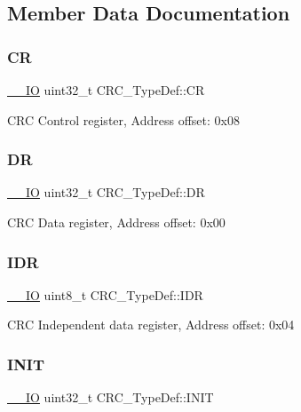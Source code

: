 \subsection{Member Data Documentation}
\mbox{\label{struct_c_r_c___type_def_af33fa5c173e1c102e6d0242fe60e569f}} 
\subsubsection{\texorpdfstring{CR}{CR}}
{\footnotesize\ttfamily \mbox{\hyperlink{core__sc300_8h_aec43007d9998a0a0e01faede4133d6be}{\+\_\+\+\_\+\+IO}} uint32\+\_\+t C\+R\+C\+\_\+\+Type\+Def\+::\+CR}

C\+RC Control register, Address offset\+: 0x08 \mbox{\label{struct_c_r_c___type_def_a50cb22870dbb9001241cec694994e5ef}} 
\subsubsection{\texorpdfstring{DR}{DR}}
{\footnotesize\ttfamily \mbox{\hyperlink{core__sc300_8h_aec43007d9998a0a0e01faede4133d6be}{\+\_\+\+\_\+\+IO}} uint32\+\_\+t C\+R\+C\+\_\+\+Type\+Def\+::\+DR}

C\+RC Data register, Address offset\+: 0x00 \mbox{\label{struct_c_r_c___type_def_ad84e8694cd4b5375ee533c2d875c3b5a}} 
\subsubsection{\texorpdfstring{IDR}{IDR}}
{\footnotesize\ttfamily \mbox{\hyperlink{core__sc300_8h_aec43007d9998a0a0e01faede4133d6be}{\+\_\+\+\_\+\+IO}} uint8\+\_\+t C\+R\+C\+\_\+\+Type\+Def\+::\+I\+DR}

C\+RC Independent data register, Address offset\+: 0x04 \mbox{\label{struct_c_r_c___type_def_a13639f272f5093e184d726ed5a8945a3}} 
\subsubsection{\texorpdfstring{INIT}{INIT}}
{\footnotesize\ttfamily \mbox{\hyperlink{core__sc300_8h_aec43007d9998a0a0e01faede4133d6be}{\+\_\+\+\_\+\+IO}} uint32\+\_\+t C\+R\+C\+\_\+\+Type\+Def\+::\+I\+N\+IT}

